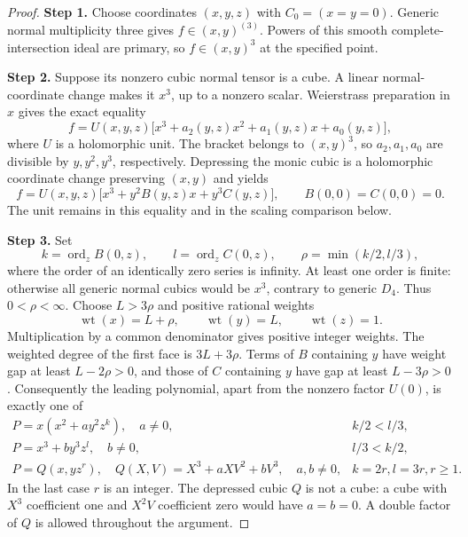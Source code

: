 \begin{proof}
\noindent\textbf{Step 1.} Choose coordinates $(x,y,z)$ with $C_0=(x=y=0)$.
Generic normal multiplicity three gives
$f\in(x,y)^{(3)}$. Powers of this smooth
complete-intersection ideal are primary, so
$f\in(x,y)^3$ at the specified point.

\noindent\textbf{Step 2.} Suppose its nonzero cubic normal tensor is a cube.
A linear normal-coordinate change makes it $x^3$, up
to a nonzero scalar. Weierstrass preparation in $x$
gives the exact equality
\[
 f=U(x,y,z)\bigl[x^3+a_2(y,z)x^2+a_1(y,z)x+a_0(y,z)\bigr],
\]
where $U$ is a holomorphic unit. The bracket belongs to
$(x,y)^3$, so $a_2,a_1,a_0$ are divisible by $y,y^2,y^3$,
respectively. Depressing the monic cubic is a holomorphic
coordinate change preserving $(x,y)$ and yields
\[
 f=U(x,y,z)\bigl[x^3+y^2B(y,z)x+y^3C(y,z)\bigr],
 \qquad B(0,0)=C(0,0)=0.                         \tag{R19.1}
\]
The unit remains in this equality and in the scaling
comparison below.

\noindent\textbf{Step 3.} Set
\[
 k=\operatorname{ord}_z B(0,z),\qquad
 l=\operatorname{ord}_z C(0,z),\qquad
 \rho=\min(k/2,l/3),
\]
where the order of an identically zero series is infinity.
At least one order is finite: otherwise all generic normal
cubics would be $x^3$, contrary to generic $D_4$.
Thus $0<\rho<\infty$. Choose $L>3\rho$ and positive
rational weights
\[
       \operatorname{wt}(x)=L+\rho,\qquad
       \operatorname{wt}(y)=L,\qquad
       \operatorname{wt}(z)=1.
\]
Multiplication by a common denominator gives positive
integer weights. The weighted degree of the first face
is $3L+3\rho$. Terms of $B$ containing $y$ have weight
gap at least $L-2\rho>0$, and those of $C$ containing
$y$ have gap at least $L-3\rho>0$. Consequently the
leading polynomial, apart from the nonzero factor $U(0)$,
is exactly one of
\[
\begin{array}{ll}
 P=x(x^2+a y^2z^k),\quad a\ne0,
       & k/2<l/3,\\[2pt]
 P=x^3+b y^3z^l,\quad b\ne0,
       & l/3<k/2,\\[2pt]
 P=Q(x,yz^r),\quad
 Q(X,V)=X^3+aXV^2+bV^3,\quad a,b\ne0,
       & k=2r, l=3r, r\ge1.
\end{array}                                                   \tag{R19.2}
\]
In the last case $r$ is an integer. The depressed cubic
$Q$ is not a cube: a cube with $X^3$ coefficient one and
$X^2V$ coefficient zero would have $a=b=0$. A double
factor of $Q$ is allowed throughout the argument.


\end{proof}
